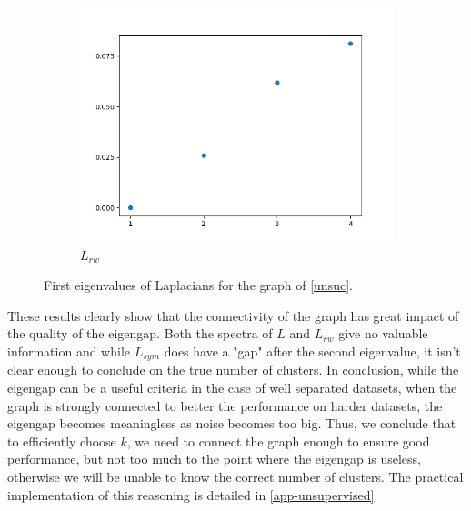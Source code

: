 \documentclass[a4paper,12pt]{article}
\theoremstyle{definition}
\theoremstyle{plain}
\begin{document}
\begin{figure}[H]
\begin{subfigure}[b]{0.3\textwidth}
		\includegraphics[width=0.9\linewidth]{figures/Fig_E6_L_rw} %
		\caption{$L_{rw}$}
	\end{subfigure}
	\caption{First eigenvalues of Laplacians for the graph of \ref{unsuc}.}
\end{figure}

These results clearly show that the connectivity of the graph has great impact of the quality of the eigengap. Both the spectra of $L$ and $L_{rw}$ give no valuable information and while $L_{sym}$ does have a "gap" after the second eigenvalue, it isn't clear enough to conclude on the true number of clusters.
In conclusion, while the eigengap can be a useful criteria in the case of well separated datasets, when the graph is strongly connected to better the performance on harder datasets, the eigengap becomes meaningless as noise becomes too big.
Thus, we conclude that to efficiently choose $k$, we need to connect the graph enough to ensure good performance, but not too much to the point where the eigengap is useless, otherwise we will be unable to know the correct number of clusters. The practical implementation of this reasoning is detailed in \ref{app-unsupervised}.

\newpage
\end{document}
